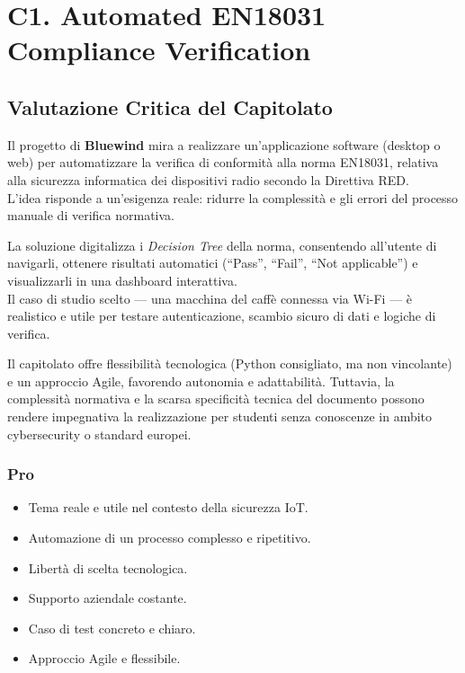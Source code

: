 \documentclass[a4paper, 11pt, oneside]{scrartcl} %
\begin{document}
\newpage
\tableofcontents %
\pagestyle{fancy} %

\newpage
\section{C1. Automated EN18031 Compliance Verification}
\subsection*{Valutazione Critica del Capitolato}
Il progetto di \textbf{Bluewind} mira a realizzare un’applicazione software (desktop o web) per automatizzare la verifica di conformità alla norma EN18031, relativa alla sicurezza informatica dei dispositivi radio secondo la Direttiva RED.\\
L’idea risponde a un’esigenza reale: ridurre la complessità e gli errori del processo manuale di verifica normativa.

La soluzione digitalizza i \emph{Decision Tree} della norma, consentendo all’utente di navigarli, ottenere risultati automatici (“Pass”, “Fail”, “Not applicable”) e visualizzarli in una dashboard interattiva.\\
Il caso di studio scelto — una macchina del caffè connessa via Wi-Fi — è realistico e utile per testare autenticazione, scambio sicuro di dati e logiche di verifica.

Il capitolato offre flessibilità tecnologica (Python consigliato, ma non vincolante) e un approccio Agile, favorendo autonomia e adattabilità. Tuttavia, la complessità normativa e la scarsa specificità tecnica del documento possono rendere impegnativa la realizzazione per studenti senza conoscenze in ambito cybersecurity o standard europei.

\subsubsection*{Pro}
\begin{itemize}
    \item Tema reale e utile nel contesto della sicurezza IoT.
    \item Automazione di un processo complesso e ripetitivo.
    \item Libertà di scelta tecnologica.
    \item Supporto aziendale costante.
    \item Caso di test concreto e chiaro.
    \item Approccio Agile e flessibile.
\end{itemize}
\end{document}
